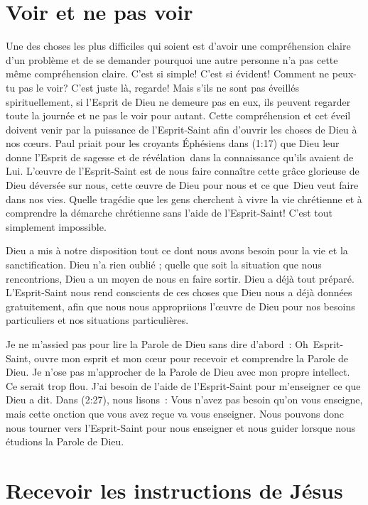 \section{Voir et ne pas voir}

Une des choses les plus difficiles qui soient est d'avoir une compréhension
 claire d'un problème et de se demander pourquoi une autre personne
 n'a pas cette même compréhension claire. C'est si simple!
 C'est si évident! Comment ne peux-tu pas le voir?
 C'est juste là, regarde! Mais s'ils ne sont pas éveillés spirituellement,
 si l'Esprit de Dieu ne demeure pas en eux, ils peuvent regarder
 toute la journée et ne pas le voir pour autant.
 Cette compréhension et cet éveil doivent venir par la puissance
 de l'Esprit-Saint afin d'ouvrir les choses de Dieu à nos cœurs.
 Paul priait pour les croyants Éphésiens dans (1:17)
 que Dieu leur donne l'Esprit de sagesse et de révélation~dans la
 connaissance qu'ils avaient de Lui.
 L'œuvre de l'Esprit-Saint est de nous faire
 connaître cette grâce glorieuse de Dieu déversée sur nous,
 cette œuvre de Dieu pour nous et ce que~Dieu veut faire dans nos vies.
 Quelle tragédie que les gens cherchent à vivre la vie chrétienne
 et à comprendre la démarche chrétienne sans l'aide de l'Esprit-Saint!
 C'est tout simplement impossible.

Dieu a mis à notre disposition tout ce dont nous avons besoin pour la vie
 et la sanctification. Dieu n'a rien oublié ; quelle que soit la situation
 que nous rencontrions, Dieu a un moyen de nous en faire sortir.
 Dieu a déjà tout préparé. L'Esprit-Saint nous rend conscients
 de ces choses que Dieu nous a déjà données gratuitement,
 afin que nous nous appropriions l'œuvre de Dieu pour nos besoins
 particuliers et nos situations particulières.

Je ne m'assied pas pour lire la Parole de Dieu sans dire d'abord~: \linebreak
 \og Oh~Esprit-Saint, ouvre mon esprit et mon cœur pour recevoir
 et comprendre la Parole de Dieu. \fg{}
 Je n'ose pas m'approcher de la Parole de Dieu avec mon propre intellect.
 Ce serait trop flou. J'ai besoin de l'aide de l'Esprit-Saint
 pour m'enseigner ce que Dieu a dit.
 Dans (2:27), nous lisons~:
 \og Vous n'avez pas besoin qu'on vous enseigne, mais cette onction
 que vous avez reçue va vous enseigner. \fg{}
 Nous pouvons donc nous tourner vers l'Esprit-Saint
 pour nous enseigner et nous guider lorsque nous étudions
 la Parole de Dieu.
 \nowidow[3]


\section{Recevoir les instructions de J\'esus}

